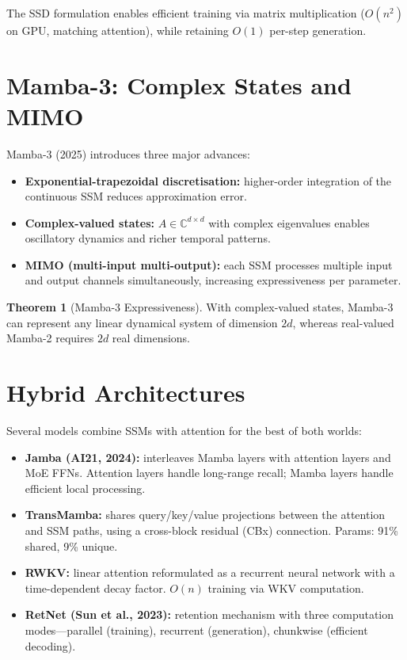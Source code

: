 \documentclass[11pt,a4paper]{book}
\theoremstyle{definition}
\newtheorem{theorem}{Theorem}[chapter]
\begin{document}
The SSD formulation enables efficient training via matrix multiplication ($O(n^2)$ on GPU, matching attention), while retaining $O(1)$ per-step generation.

\section{Mamba-3: Complex States and MIMO}

Mamba-3 (2025) introduces three major advances:

\begin{itemize}
	\item \textbf{Exponential-trapezoidal discretisation:} higher-order integration of the continuous SSM reduces approximation error.
	\item \textbf{Complex-valued states:} $A \in \mathbb{C}^{d \times d}$ with complex eigenvalues enables oscillatory dynamics and richer temporal patterns.
	\item \textbf{MIMO (multi-input multi-output):} each SSM processes multiple input and output channels simultaneously, increasing expressiveness per parameter.
\end{itemize}

\begin{theorem}[Mamba-3 Expressiveness]
	With complex-valued states, Mamba-3 can represent any linear dynamical system of dimension $2d$, whereas real-valued Mamba-2 requires $2d$ real dimensions.
\end{theorem}

\section{Hybrid Architectures}

Several models combine SSMs with attention for the best of both worlds:

\begin{itemize}
	\item \textbf{Jamba (AI21, 2024):} interleaves Mamba layers with attention layers and MoE FFNs. Attention layers handle long-range recall; Mamba layers handle efficient local processing.
	\item \textbf{TransMamba:} shares query/key/value projections between the attention and SSM paths, using a cross-block residual (CBx) connection. Params: 91\% shared, 9\% unique.
	\item \textbf{RWKV:} linear attention reformulated as a recurrent neural network with a time-dependent decay factor. $O(n)$ training via WKV computation.
	\item \textbf{RetNet (Sun et al., 2023):} retention mechanism with three computation modes---parallel (training), recurrent (generation), chunkwise (efficient decoding).
\end{itemize}
\end{document}
